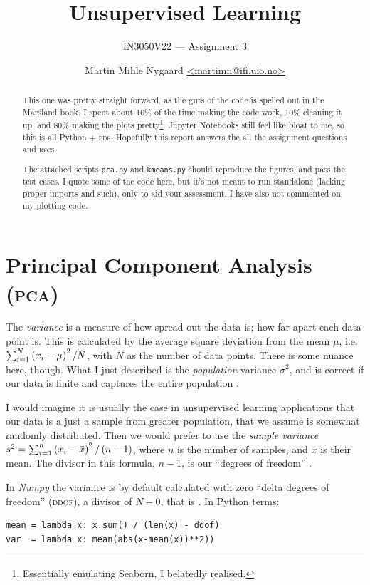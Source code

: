 \documentclass[british]{article}
\title{Unsupervised Learning}
\subtitle{IN3050V22 --- Assignment 3}
\author{%
  Martin Mihle Nygaard
  \textsf{\href{mailto:martimn@ifi.uio.no}{<martimn@ifi.uio.no>}}
}
\newcommand{\pca}{\texorpdfstring{\textsc{pca}}{PCA}}
\begin{document}
\maketitle

\renewcommand{\abstractname}{Readme}
\begin{abstract}
  \noindent
  This one was pretty straight forward, as the guts of the code is spelled out
  in the Marsland book. I spent about 10\% of the time making the code work,
  10\% cleaning it up, and 80\% making the plots pretty\footnote{Essentially
  emulating Seaborn, I belatedly realised.}. Jupyter Notebooks still feel like
  bloat to me, so this is all Python + \textsc{pdf}. Hopefully this report
  answers the all the assignment questions and \textsc{rfc}s.

  \hbox

  \noindent
  The attached scripts \texttt{pca.py} and \texttt{kmeans.py} should reproduce
  the figures, and pass the test cases. I quote some of the code here, but it's
  not meant to run standalone (lacking proper imports and such), only to aid
  your assessment. I have also not commented on my plotting code.
\end{abstract}

\section{Principal Component Analysis (\pca)}

 The \emph{variance} is a measure of how
spread out the data is; how far apart each data point is. This is calculated by
the average square deviation from the mean $\mu$, i.e.~$\sum_{i=1}^N
\del{x_i-\mu}^2 / N$, with $N$ as the number of data points. There is some
nuance here, though. What I just described is the \emph{population} variance
$\sigma^2$, and is correct if our data is finite and captures the entire
population \autocite[35]{devore-berk}.

I would imagine it is usually the case in unsupervised learning applications
that our data is a just a sample from greater population, that we assume is
somewhat randomly distributed. Then we would prefer to use the \emph{sample
variance} $s^2 = \sum_{i=1}^n \del{x_i-\bar x}^2 / \del{n - 1}$, where $n$ is
the number of samples, and $\bar x$ is their mean. The divisor in this formula,
$n-1$, is our \enquote{degrees of freedom} \autocite[34,35]{devore-berk}. 

In \emph{Numpy} the variance is by default calculated with zero \enquote{delta
degrees of freedom} (\textsc{ddof}), a divisor of $N-0$, that is
\autocite[\texttt{numpy.var}]{np}. In Python terms:
\begin{lstlisting}[numbers=none]
mean = lambda x: x.sum() / (len(x) - ddof)
var  = lambda x: mean(abs(x-mean(x))**2))
\end{lstlisting}
\end{document}
